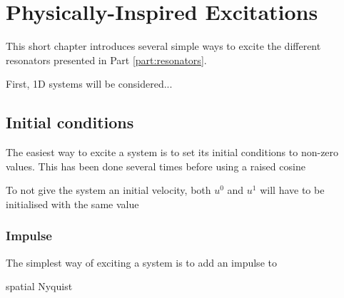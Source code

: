 \chapter{Physically-Inspired Excitations}\label{ch:physInspExcitations}
This short chapter introduces several simple ways to excite the different resonators presented in Part \ref{part:resonators}.

First, 1D systems will be considered... 


\section{Initial conditions}
The easiest way to excite a system is to set its initial conditions to non-zero values. This has been done several times before using a raised cosine 

To not give the system an initial velocity, both $u^0$ and $u^1$ will have to be initialised with the same value

\subsection{Impulse}
The simplest way of exciting a system is to add an impulse to 

spatial Nyquist

